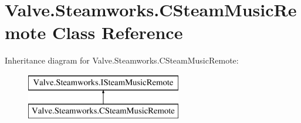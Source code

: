 \hypertarget{classValve_1_1Steamworks_1_1CSteamMusicRemote}{}\section{Valve.\+Steamworks.\+C\+Steam\+Music\+Remote Class Reference}
\label{classValve_1_1Steamworks_1_1CSteamMusicRemote}
Inheritance diagram for Valve.\+Steamworks.\+C\+Steam\+Music\+Remote\+:\begin{figure}[H]
\begin{center}
\leavevmode
\includegraphics[height=2.000000cm]{classValve_1_1Steamworks_1_1CSteamMusicRemote}
\end{center}
\end{figure}
